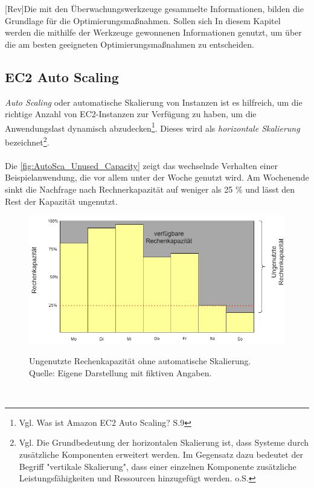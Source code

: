 [Rev]Die mit den Überwachungswerkzeuge gesammelte Informationen, bilden die Grundlage für die Optimierungsmaßnahmen. Sollen sich In diesem Kapitel werden die mithilfe der Werkzeuge gewonnenen Informationen genutzt, um über die am besten geeigneten Optimierungsmaßnahmen zu entscheiden.

\subsection{EC2 Auto Scaling}
\textit{Auto Scaling} oder automatische Skalierung von Instanzen ist es hilfreich, um die richtige Anzahl von EC2-Instanzen zur Verfügung zu haben, um die Anwendungslast dynamisch abzudecken\footnote{Vgl. Was ist Amazon EC2 Auto Scaling? S.9\cite{AMZ31} }. Dieses wird als \textit{horizontale Skalierung} bezeichnet\footnote{Vgl. Die Grundbedeutung der horizontalen Skalierung ist, dass Systeme durch zusätzliche Komponenten erweitert werden. Im Gegensatz dazu bedeutet der Begriff "vertikale Skalierung", dass einer einzelnen Komponente zusätzliche Leistungsfähigkeiten und Ressourcen hinzugefügt werden. o.S.\cite{TECH1} }.
\\\\
Die \autoref{fig:AutoSca_Unused_Capacity} zeigt das wechselnde Verhalten einer Beispielanwendung, die vor allem unter der Woche genutzt wird. Am Wochenende sinkt die Nachfrage nach Rechnerkapazität auf weniger als 25 \% und lässt den Rest der Kapazität ungenutzt. 
\begin{figure}[h]
    \centering
    \includegraphics[scale=0.5]{sources/AutoCap Unused Capacity}
    \caption[Ungenutzte Rechenkapazität ohne automatische Skalierung]{}
    \label{fig:AutoSca_Unused_Capacity} Ungenutzte Rechenkapazität ohne automatische Skalierung. \\
    Quelle: Eigene Darstellung mit fiktiven Angaben. 
  \end{figure}\\
